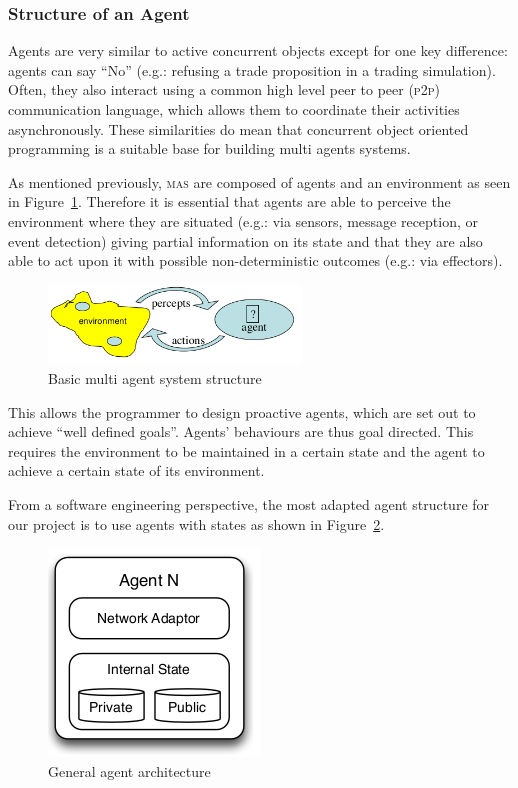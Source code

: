 \subsubsection{Structure of an Agent}

Agents are very similar to active concurrent objects except for one key difference: agents can say ``No'' (e.g.: refusing a trade proposition in a trading simulation). Often, they also interact using a common high level peer to peer (\textsc{p2p}) communication language, which allows them to coordinate their activities asynchronously. These similarities do mean that concurrent object oriented programming is a suitable base for building multi agents systems.

As mentioned previously, \textsc{mas} are composed of agents and an environment as seen in Figure~\ref{fig:mas}. Therefore it is essential that agents are able to perceive the environment where they are situated (e.g.: via sensors, message reception, or event detection) giving partial information on its state and that they are also able to act upon it with possible non-deterministic outcomes (e.g.: via effectors).

\begin{figure}[h!]
	\centering
	\includegraphics[width=0.6\textwidth]{img/mas.png}
	\caption{Basic multi agent system structure}
	\label{fig:mas}
\end{figure}

This allows the programmer to design proactive agents, which are set out to achieve ``well defined goals''. Agents' behaviours are thus goal directed. This requires the environment to be maintained in a certain state and the agent to achieve a certain state of its environment.~\cite{MAS-DoC}

From a software engineering perspective, the most adapted agent structure for our project is to use agents with states as shown in Figure~\ref{fig:agent-architecture}.

\begin{figure}[h!]
	\centering
	\includegraphics[]{img/agent-architecture.png}
	\caption{General agent architecture~\cite{Sam-Transfer-Report}}
	\label{fig:agent-architecture}
\end{figure}

